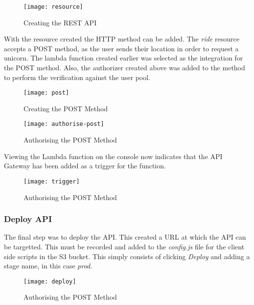   \begin{figure}[H]
    \caption{Creating the REST API}
    \centering
    \texttt{[image: resource]}
    \label{fig:resource}
  \end{figure}
  
  With the resource created the HTTP method can be added. The \textit{ride} resource accepts a POST method, as the user sends their location in order to request a unicorn. The lambda function created earlier was selected as the integration for the POST method. Also, the authorizer created above was added to the method to perform the verification against the user pool.
  
  \begin{figure}[H]
    \caption{Creating the POST Method}
    \centering
    \texttt{[image: post]}
    \label{fig:post}
  \end{figure}
    
  \begin{figure}[H]
    \caption{Authorising the POST Method}
    \centering
    \texttt{[image: authorise-post]}
    \label{fig:authorise-post}
  \end{figure}
  
  \noindent Viewing the Lambda function on the console now indicates that the API Gateway has been added as a trigger for the function.
  
  \begin{figure}[H]
    \caption{Authorising the POST Method}
    \centering
    \texttt{[image: trigger]}
    \label{fig:trigger}
  \end{figure}
  
  \subsubsection{Deploy API}
  The final step was to deploy the API. This created a URL at which the API can be targetted. This must be recorded and added to the \textit{config.js} file for the client side scripts in the S3 bucket. This simply consists of clicking \textit{Deploy} and adding a stage name, in this case \textit{prod}.
  
  \begin{figure}[H]
    \caption{Authorising the POST Method}
    \centering
    \texttt{[image: deploy]}
    \label{fig:deploy}
  \end{figure}
  
